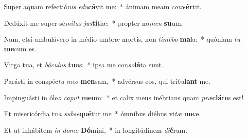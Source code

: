 \item Super aquam refectió\textit{nis} \textit{e}\textit{du}\textbf{cá}vit me:~* ánimam meam \textit{con}\textbf{vér}tit.
\item Dedúxit me super sé\textit{mi}\textit{tas} \textit{jus}\textbf{tí}tiæ:~* propter no\textit{men} \textbf{su}um.
\item Nam, etsi ambulávero in médio umbræ mortis, non \textit{ti}\textit{mé}\textit{bo} \textbf{ma}la:~* quóniam \textit{tu} \textbf{me}cum es.
\item Virga tua, et \textit{bá}\textit{cu}\textit{lus} \textbf{tu}us:~* ipsa me con\textit{so}\textbf{lá}ta sunt.
\item Parásti in conspéc\textit{tu} \textit{me}\textit{o} \textbf{men}sam,~* advérsus eos, qui trí\textit{bu}\textbf{lant} me.
\item Impinguásti in óle\textit{o} \textit{ca}\textit{put} \textbf{me}um:~* et calix meus inébrians quam \textit{præ}\textbf{clá}rus est!
\item Et misericórdia tu\textit{a} \textit{sub}\textit{se}\textbf{qué}tur me~* ómnibus diébus vi\textit{tæ} \textbf{me}æ.
\item Et ut inhábitem \textit{in} \textit{do}\textit{mo} \textbf{Dó}mini,~* in longitúdinem \textit{di}\textbf{é}rum.
